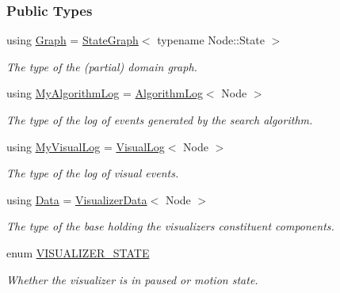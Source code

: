 \subsubsection*{Public Types}
\begin{DoxyCompactItemize}
\item 
using \hyperlink{structui_1_1Visualizer_a1ad5cd8b61e725e66067834620833f04}{Graph} = \hyperlink{structStateGraph}{State\+Graph}$<$ typename Node\+::\+State $>$\hypertarget{structui_1_1Visualizer_a1ad5cd8b61e725e66067834620833f04}{}\label{structui_1_1Visualizer_a1ad5cd8b61e725e66067834620833f04}

\begin{DoxyCompactList}\small\item\em The type of the (partial) domain graph. \end{DoxyCompactList}\item 
using \hyperlink{structui_1_1Visualizer_aa0105c6aa2f63989c4496338818aa465}{My\+Algorithm\+Log} = \hyperlink{structAlgorithmLog}{Algorithm\+Log}$<$ Node $>$\hypertarget{structui_1_1Visualizer_aa0105c6aa2f63989c4496338818aa465}{}\label{structui_1_1Visualizer_aa0105c6aa2f63989c4496338818aa465}

\begin{DoxyCompactList}\small\item\em The type of the log of events generated by the search algorithm. \end{DoxyCompactList}\item 
using \hyperlink{structui_1_1Visualizer_a37e53ab58b6782341a54b94611390eed}{My\+Visual\+Log} = \hyperlink{structVisualLog}{Visual\+Log}$<$ Node $>$\hypertarget{structui_1_1Visualizer_a37e53ab58b6782341a54b94611390eed}{}\label{structui_1_1Visualizer_a37e53ab58b6782341a54b94611390eed}

\begin{DoxyCompactList}\small\item\em The type of the log of visual events. \end{DoxyCompactList}\item 
using \hyperlink{structui_1_1Visualizer_ac4e001d4cd819ff448b228ee6398297c}{Data} = \hyperlink{structVisualizerData}{Visualizer\+Data}$<$ Node $>$\hypertarget{structui_1_1Visualizer_ac4e001d4cd819ff448b228ee6398297c}{}\label{structui_1_1Visualizer_ac4e001d4cd819ff448b228ee6398297c}

\begin{DoxyCompactList}\small\item\em The type of the base holding the visualizer\textquotesingle{}s constituent components. \end{DoxyCompactList}\item 
enum \hyperlink{structui_1_1Visualizer_a2384b80db05920ce2bdddab4fad53a47}{V\+I\+S\+U\+A\+L\+I\+Z\+E\+R\+\_\+\+S\+T\+A\+TE} \hypertarget{structui_1_1Visualizer_a2384b80db05920ce2bdddab4fad53a47}{}\label{structui_1_1Visualizer_a2384b80db05920ce2bdddab4fad53a47}
\begin{DoxyCompactList}\small\item\em Whether the visualizer is in paused or motion state. \end{DoxyCompactList}
\end{DoxyCompactItemize}
